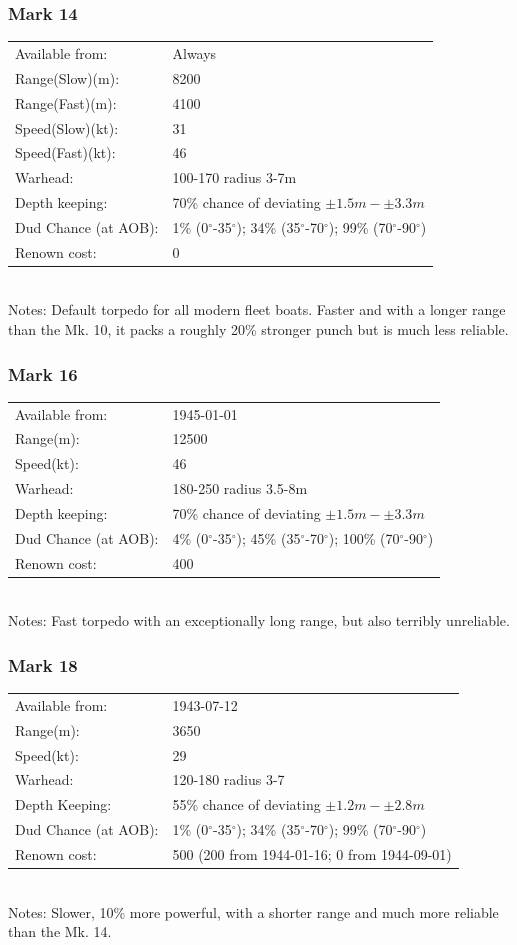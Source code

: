 \documentclass{article}
\newcommand{\degree}{$^{\circ}$}
\begin{document}
\subsubsection{Mark 14}
\begin{tabular}{l|l}
Available from:& Always\\
Range(Slow)(m):& 8200\\
Range(Fast)(m):& 4100\\
Speed(Slow)(kt):&31\\
Speed(Fast)(kt):& 46\\
Warhead:& 100-170 radius 3-7m\\
Depth keeping:& 70\% chance of deviating $\pm 1.5m - \pm 3.3m$\\
Dud Chance (at AOB):& 1\% (0\degree-35\degree); 34\% (35\degree-70\degree); 99\% (70\degree-90\degree)\\
Renown cost:& 0\\
\end{tabular} \\
Notes: Default torpedo for all modern fleet boats. Faster and with a longer range than the Mk. 10, it packs a roughly 20\% stronger punch but is much less reliable.

\subsubsection{Mark 16}
\begin{tabular}{l|l}
Available from:& 1945-01-01\\
Range(m):& 12500\\
Speed(kt):&46\\
Warhead:& 180-250 radius 3.5-8m\\
Depth keeping:&  70\% chance of deviating $\pm 1.5m - \pm 3.3m$\\
Dud Chance (at AOB):& 4\% (0\degree-35\degree); 45\% (35\degree-70\degree); 100\% (70\degree-90\degree)\\
Renown cost:& 400\\
\end{tabular} \\
Notes: Fast torpedo with an exceptionally long range, but also terribly unreliable.

\subsubsection{Mark 18}
\begin{tabular}{l|l}
Available from:& 1943-07-12\\
Range(m):& 3650\\
Speed(kt):&29\\
Warhead:& 120-180 radius 3-7\\
Depth Keeping:& 55\% chance of deviating $\pm 1.2m - \pm 2.8m$\\
Dud Chance (at AOB):& 1\% (0\degree-35\degree); 34\% (35\degree-70\degree); 99\% (70\degree-90\degree)\\
Renown cost:&  500 (200 from 1944-01-16; 0 from 1944-09-01)\\
\end{tabular} \\
Notes: Slower, 10\% more powerful, with a shorter range and much more reliable than the Mk. 14.
\end{document}
